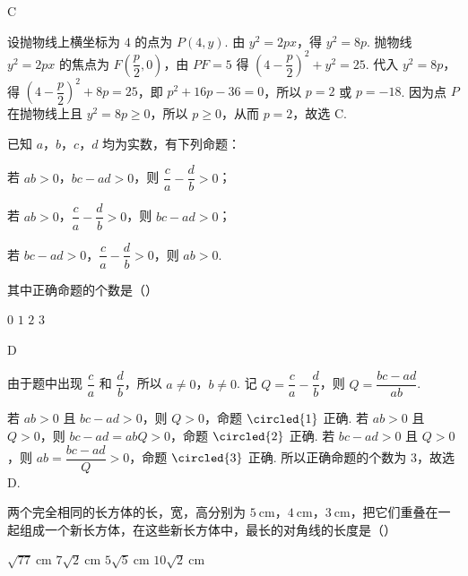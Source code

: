 \begin{answer}
C
\end{answer}

\begin{solution}
设抛物线上横坐标为 \(4\) 的点为 \(P\left(4,y\right)\). 由 \(y^{2}=2px\)，得 \(y^{2}=8p\). 抛物线 \(y^{2}=2px\) 的焦点为 \(F\left(\dfrac{p}{2},0\right)\)，由 \(PF=5\) 得 \(\left(4-\dfrac{p}{2}\right)^{2}+y^{2}=25\). 代入 \(y^{2}=8p\)，得 \(\left(4-\dfrac{p}{2}\right)^{2}+8p=25\)，即 \(p^{2}+16p-36=0\)，所以 \(p=2\) 或 \(p=-18\). 因为点 \(P\) 在抛物线上且 \(y^{2}=8p\geq0\)，所以 \(p\geq0\)，从而 \(p=2\)，故选 C.
\end{solution}


\begin{problem}
已知 \(a\)，\(b\)，\(c\)，\(d\) 均为实数，有下列命题：
\begin{circlelist}
\item 若 \(ab>0\)，\(bc-ad>0\)，则 \(\dfrac ca-\dfrac db>0\)；
\item 若 \(ab>0\)，\(\dfrac ca-\dfrac db>0\)，则 \(bc-ad>0\)；
\item 若 \(bc-ad>0\)，\(\dfrac ca-\dfrac db>0\)，则 \(ab>0\).
\end{circlelist}
其中正确命题的个数是（\quad）

\choices
    {\(0\)}
    {\(1\)}
    {\(2\)}
    {\(3\)}
\end{problem}

\begin{answer}
D
\end{answer}

\begin{solution}
由于题中出现 \(\dfrac ca\) 和 \(\dfrac db\)，所以 \(a\ne0\)，\(b\ne0\). 记 \(Q=\dfrac ca-\dfrac db\)，则 \(Q=\dfrac{bc-ad}{ab}\).

若 \(ab>0\) 且 \(bc-ad>0\)，则 \(Q>0\)，命题 \(\circled{1}\) 正确. 若 \(ab>0\) 且 \(Q>0\)，则 \(bc-ad=abQ>0\)，命题 \(\circled{2}\) 正确. 若 \(bc-ad>0\) 且 \(Q>0\)，则 \(ab=\dfrac{bc-ad}{Q}>0\)，命题 \(\circled{3}\) 正确. 所以正确命题的个数为 \(3\)，故选 D.
\end{solution}


\begin{problem}
两个完全相同的长方体的长，宽，高分别为 \(5\mathrm{~cm}\)，\(4\mathrm{~cm}\)，\(3\mathrm{~cm}\)，把它们重叠在一起组成一个新长方体，在这些新长方体中，最长的对角线的长度是（\quad）

\choices
    {\(\sqrt{77}\mathrm{~cm}\)}
    {\(7\sqrt2\mathrm{~cm}\)}
    {\(5\sqrt5\mathrm{~cm}\)}
    {\(10\sqrt2\mathrm{~cm}\)}
\end{problem}

